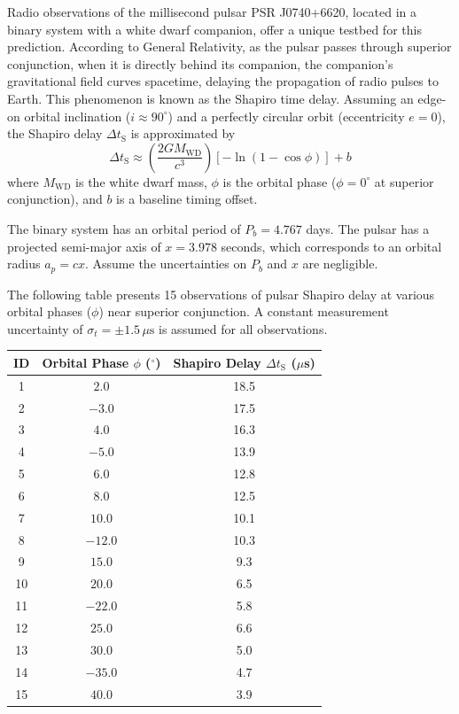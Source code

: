 Radio observations of the millisecond pulsar PSR J0740+6620, located in a
binary system with a white dwarf companion, offer a unique testbed for this
prediction. According to General Relativity, as the pulsar passes through
superior conjunction, when it is directly behind its companion, the
companion's gravitational field curves spacetime, delaying the propagation of
radio pulses to Earth. This phenomenon is known as the Shapiro time delay.
Assuming an edge-on orbital inclination ($i \approx 90^\circ$) and a perfectly
circular orbit (eccentricity $e = 0$), the Shapiro delay
$\Delta t_{\mathrm{S}}$ is approximated by
\[
\Delta t_{\mathrm{S}} \approx
  \left(\frac{2GM_{\mathrm{WD}}}{c^3}\right)\left[-\ln\left(1-\cos\phi\right)\right] + b
\]
where $M_{\mathrm{WD}}$ is the white dwarf mass, $\phi$ is the orbital phase
($\phi = 0^\circ$ at superior conjunction), and $b$ is a baseline timing
offset.

The binary system has an orbital period of $P_b = 4.767$ days. The pulsar has
a projected semi-major axis of $x = 3.978$ seconds, which corresponds to an
orbital radius $a_p = cx$. Assume the uncertainties on $P_b$ and $x$ are
negligible.

The following table presents 15 observations of pulsar Shapiro delay at
various orbital phases ($\phi$) near superior conjunction. A constant
measurement uncertainty of $\sigma_t = \pm 1.5\,\mu\mathrm{s}$ is assumed for
all observations.

\begin{center}
\begin{tabular}{ccc}
\toprule
ID & Orbital Phase $\phi$ ($^\circ$) & Shapiro Delay $\Delta t_{\mathrm{S}}$ ($\mu$s) \\
\midrule
1  & $2.0$   & 18.5 \\
2  & $-3.0$  & 17.5 \\
3  & $4.0$   & 16.3 \\
4  & $-5.0$  & 13.9 \\
5  & $6.0$   & 12.8 \\
6  & $8.0$   & 12.5 \\
7  & $10.0$  & 10.1 \\
8  & $-12.0$ & 10.3 \\
9  & $15.0$  & 9.3 \\
10 & $20.0$  & 6.5 \\
11 & $-22.0$ & 5.8 \\
12 & $25.0$  & 6.6 \\
13 & $30.0$  & 5.0 \\
14 & $-35.0$ & 4.7 \\
15 & $40.0$  & 3.9 \\
\bottomrule
\end{tabular}
\end{center}

